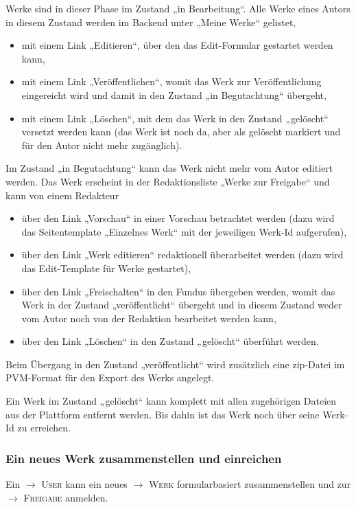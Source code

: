 \documentclass[a4paper,11pt]{article}
\newcommand{\glossar}[1]{{$\to$ \textsc{#1}}}
\begin{document}
Werke sind in dieser Phase im Zustand „in Bearbeitung“. Alle Werke eines Autors
in diesem Zustand werden im Backend unter „Meine Werke“ gelistet,
\begin{itemize}
\item mit einem Link „Editieren“, über den das Edit-Formular gestartet werden
  kann,
\item mit einem Link „Veröffentlichen“, womit das Werk zur Veröffentlichung
  eingereicht wird und damit in den Zustand „in Begutachtung“ übergeht,
\item mit einem Link „Löschen“, mit dem das Werk in den Zustand „gelöscht“
  versetzt werden kann (das Werk ist noch da, aber als gelöscht markiert und
  für den Autor nicht mehr zugänglich).
\end{itemize}
Im Zustand „in Begutachtung“ kann das Werk nicht mehr vom Autor editiert
werden.  Das Werk erscheint in der Redaktionsliste „Werke zur Freigabe“ und
kann von einem Redakteur
\begin{itemize}
\item über den Link „Vorschau“ in einer Vorschau betrachtet werden (dazu wird
  das Seitentemplate „Einzelnes Werk“ mit der jeweiligen Werk-Id aufgerufen),
\item über den Link „Werk editieren“ redaktionell überarbeitet werden (dazu
  wird das Edit-Template für Werke gestartet),
\item über den Link „Freischalten“ in den Fundus übergeben werden, womit das
  Werk in der Zustand „veröffentlicht“ übergeht und in diesem Zustand weder
  vom Autor noch von der Redaktion bearbeitet werden kann,
\item über den Link „Löschen“ in den Zustand „gelöscht“ überführt werden.
\end{itemize}
Beim Übergang in den Zustand „veröffentlicht“ wird zusätzlich eine zip-Datei
im PVM-Format für den Export des Werks angelegt.

Ein Werk im Zustand „gelöscht“ kann komplett mit allen zugehörigen Dateien aus
der Plattform entfernt werden. Bis dahin ist das Werk noch über seine Werk-Id
zu erreichen.

\subsubsection{Ein neues Werk zusammenstellen und einreichen}

Ein \glossar{User} kann ein neues \glossar{Werk} formularbasiert
zusammenstellen und zur \glossar{Freigabe} anmelden.  
\end{document}
